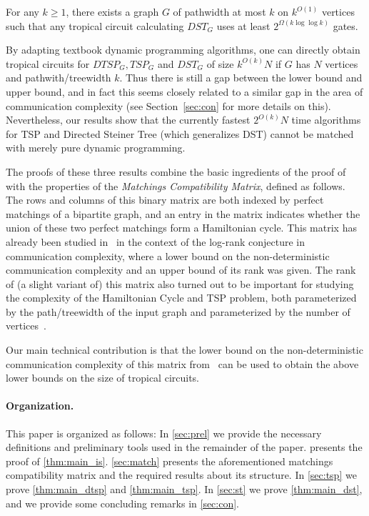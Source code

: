 \begin{theorem}\label{thm:main_dst}
    For any $k \geq 1$, there exists a graph $G$ of pathwidth at most $k$ on $k^{O(1)}$ vertices such that any tropical circuit calculating $DST_{G}$ uses at least $2^{\Omega(k \log \log k)}$ gates.
\end{theorem}

By adapting textbook dynamic programming algorithms, one can directly obtain tropical circuits for $DTSP_G,TSP_G$ and $DST_G$ of size $k^{O(k)} N$ if $G$ has $N$ vertices and pathwith/treewidth $k$. Thus there is still a gap between the lower bound and upper bound, and in fact this seems closely related to a similar gap in the area of communication complexity (see Section~\ref{sec:con} for more details on this). Nevertheless, our results show that the currently fastest $2^{O(k)}N$ time algorithms for TSP and Directed Steiner Tree (which generalizes DST) cannot be matched with merely pure dynamic programming.

The proofs of these three results combine the basic ingredients of the proof of  with the properties of the \emph{Matchings Compatibility Matrix}, defined as follows. The rows and columns of this binary matrix are both indexed by perfect matchings of a bipartite graph, and an entry in the matrix indicates whether the union of these two perfect matchings form a Hamiltonian cycle. This matrix has already been studied in~\cite{raz1995log} in the context of the log-rank conjecture in communication complexity, where a lower bound on the non-deterministic communication complexity and an upper bound of its rank was given. The rank of (a slight variant of) this matrix also turned out to be important for studying the complexity of the Hamiltonian Cycle and TSP problem, both parameterized by the path/treewidth of the input graph and parameterized by the number of vertices~\cite{CurticapeanLN18,CyganKN18,Nederlof20}.

Our main technical contribution is that the lower bound on the non-deterministic communication complexity of this matrix from~\cite{raz1995log} can be used to obtain the above lower bounds on the size of tropical circuits.

\paragraph{Organization.}
This paper is organized as follows:
In \cref{sec:prel} we provide the necessary definitions and preliminary tools used in the remainder of the paper.  presents the proof of \cref{thm:main_is}.
\cref{sec:match} presents the aforementioned matchings compatibility matrix and the required results about its structure.
In \cref{sec:tsp} we prove \cref{thm:main_dtsp} and \cref{thm:main_tsp}.
In \cref{sec:st} we prove \cref{thm:main_dst}, and we provide some concluding remarks in \cref{sec:con}.



